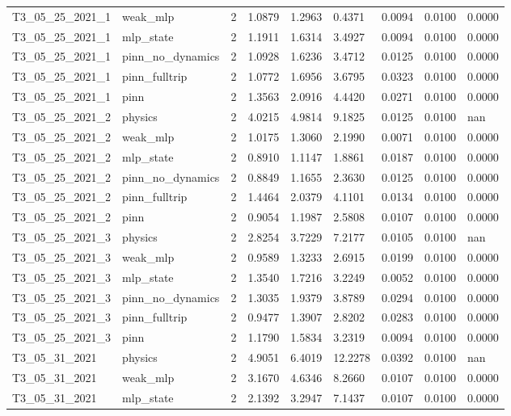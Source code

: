 \begin{table}[t]
\begin{tabular}{lllllllll}
T3\_05\_25\_2021\_1 & weak\_mlp & 2 & 1.0879 & 1.2963 & 0.4371 & 0.0094 & 0.0100 & 0.0000 \\
T3\_05\_25\_2021\_1 & mlp\_state & 2 & 1.1911 & 1.6314 & 3.4927 & 0.0094 & 0.0100 & 0.0000 \\
T3\_05\_25\_2021\_1 & pinn\_no\_dynamics & 2 & 1.0928 & 1.6236 & 3.4712 & 0.0125 & 0.0100 & 0.0000 \\
T3\_05\_25\_2021\_1 & pinn\_fulltrip & 2 & 1.0772 & 1.6956 & 3.6795 & 0.0323 & 0.0100 & 0.0000 \\
T3\_05\_25\_2021\_1 & pinn & 2 & 1.3563 & 2.0916 & 4.4420 & 0.0271 & 0.0100 & 0.0000 \\
T3\_05\_25\_2021\_2 & physics & 2 & 4.0215 & 4.9814 & 9.1825 & 0.0125 & 0.0100 & nan \\
T3\_05\_25\_2021\_2 & weak\_mlp & 2 & 1.0175 & 1.3060 & 2.1990 & 0.0071 & 0.0100 & 0.0000 \\
T3\_05\_25\_2021\_2 & mlp\_state & 2 & 0.8910 & 1.1147 & 1.8861 & 0.0187 & 0.0100 & 0.0000 \\
T3\_05\_25\_2021\_2 & pinn\_no\_dynamics & 2 & 0.8849 & 1.1655 & 2.3630 & 0.0125 & 0.0100 & 0.0000 \\
T3\_05\_25\_2021\_2 & pinn\_fulltrip & 2 & 1.4464 & 2.0379 & 4.1101 & 0.0134 & 0.0100 & 0.0000 \\
T3\_05\_25\_2021\_2 & pinn & 2 & 0.9054 & 1.1987 & 2.5808 & 0.0107 & 0.0100 & 0.0000 \\
T3\_05\_25\_2021\_3 & physics & 2 & 2.8254 & 3.7229 & 7.2177 & 0.0105 & 0.0100 & nan \\
T3\_05\_25\_2021\_3 & weak\_mlp & 2 & 0.9589 & 1.3233 & 2.6915 & 0.0199 & 0.0100 & 0.0000 \\
T3\_05\_25\_2021\_3 & mlp\_state & 2 & 1.3540 & 1.7216 & 3.2249 & 0.0052 & 0.0100 & 0.0000 \\
T3\_05\_25\_2021\_3 & pinn\_no\_dynamics & 2 & 1.3035 & 1.9379 & 3.8789 & 0.0294 & 0.0100 & 0.0000 \\
T3\_05\_25\_2021\_3 & pinn\_fulltrip & 2 & 0.9477 & 1.3907 & 2.8202 & 0.0283 & 0.0100 & 0.0000 \\
T3\_05\_25\_2021\_3 & pinn & 2 & 1.1790 & 1.5834 & 3.2319 & 0.0094 & 0.0100 & 0.0000 \\
T3\_05\_31\_2021 & physics & 2 & 4.9051 & 6.4019 & 12.2278 & 0.0392 & 0.0100 & nan \\
T3\_05\_31\_2021 & weak\_mlp & 2 & 3.1670 & 4.6346 & 8.2660 & 0.0107 & 0.0100 & 0.0000 \\
T3\_05\_31\_2021 & mlp\_state & 2 & 2.1392 & 3.2947 & 7.1437 & 0.0107 & 0.0100 & 0.0000 \\

\end{tabular}
\end{table}

